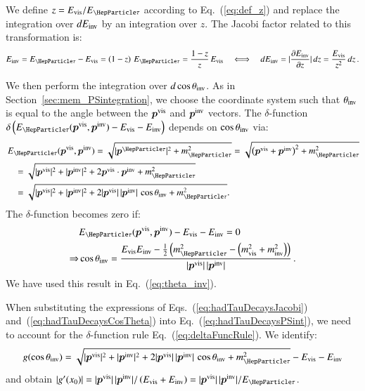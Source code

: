 We define $z = E_{\vis}/E_{\Pgt}$ according to Eq.~(\ref{eq:def_z}) and replace the integration over $dE_{\textrm{inv}}$ by an integration over $z$.
The Jacobi factor related to this transformation is:
\begin{equation}
E_{\inv} = E_{\Pgt} - E_{\vis} = \left( 1 - z \right)
\, E_{\Pgt} = \frac{1 - z}{z} \, E_{\vis}
  \quad \Longleftrightarrow \quad dE_{\inv} = \lvert \frac{\partial E_{\inv}}{\partial z} \rvert \, dz = \frac{E_{\vis}}{z^{2}} \, dz \, .
\label{eq:hadTauDecaysJacobi}
\end{equation}

We then perform the integration over $d\cos\theta_{\textrm{inv}}$.
As in Section~\ref{sec:mem_PSintegration}, we choose the coordinate system such that
$\theta_{\textrm{inv}}$ is equal to the angle between the $\bm{p}^{\textrm{vis}}$ and $\bm{p}^{\textrm{inv}}$ vectors.
The $\delta$-function $\delta \left( E_{\Pgt}(\bm{p}^{\vis}, \bm{p}^{\inv}) - E_{\vis} - E_{\inv} \right)$ depends on $\cos\theta_{\textrm{inv}}$ via:
\begin{align}
& \, E_{\Pgt}(\bm{p}^{\vis}, \bm{p}^{\inv}) 
= \sqrt{\vert\bm{p}^{\Pgt}\vert^{2} + m^{2}_{\Pgt}} = \sqrt{\left( \bm{p}^{\vis} + \bm{p}^{\inv} \right)^2 + m^{2}_{\Pgt}} \nonumber \\
& \quad = \sqrt{\vert\bm{p}^{\vis}\vert^{2} + \vert\bm{p}^{\inv}\vert^{2} + 2 \bm{p}^{\vis}
  \cdot \bm{p}^{\inv} + m^{2}_{\Pgt}} \nonumber \\
& \quad = \sqrt{\vert\bm{p}^{\vis}\vert^{2} + \vert\bm{p}^{\inv}\vert^{2} + 2 \vert\bm{p}^{\vis}\vert \, \vert\bm{p}^{\inv}\vert \, \cos\theta_{\inv} + m^{2}_{\Pgt}}.
\end{align}
The $\delta$-function becomes zero if:
\begin{align}
& E_{\Pgt}(\bm{p}^{\vis}, \bm{p}^{\inv}) - E_{\vis} - E_{\inv} = 0 \nonumber \\
\Rightarrow & \cos\theta_{\inv} 
  = \frac{E_{\vis} E_{\inv} - \frac{1}{2} \left(m^{2}_{\Pgt} - \left(
        m^{2}_{\vis} + m^{2}_{\inv} \right)
    \right)}{\vert\bm{p}^{\vis}\vert \, \vert\bm{p}^{\inv}\vert} \, .
\label{eq:hadTauDecaysCosTheta}
\end{align}
We have used this result in Eq.~(\ref{eq:theta_inv}).

When substituting the expressions of Eqs.~(\ref{eq:hadTauDecaysJacobi}) and~(\ref{eq:hadTauDecaysCosTheta}) into Eq.~(\ref{eq:hadTauDecaysPSint}),
we need to account for the $\delta$-function rule
Eq.~(\ref{eq:deltaFuncRule}).
We identify:
\begin{equation} 
g(\cos\theta_{\inv}) = \sqrt{\vert\bm{p}^{\vis}\vert^{2} + \vert\bm{p}^{\inv}\vert^{2}
  + 2 \vert\bm{p}^{\vis}\vert \, \vert\bm{p}^{\inv}\vert \,
  \cos\theta_{\inv} + m^{2}_{\Pgt}} - E_{\vis} - E_{\inv}
\end{equation}
and obtain $\vert g'(x_{0}) \vert = \vert\bm{p}^{\vis}\vert \,
\vert\bm{p}^{\inv}\vert / \left( E_{\vis} + E_{\inv} \right) = \vert\bm{p}^{\vis}\vert \,
\vert\bm{p}^{\inv}\vert / E_{\Pgt}$.

